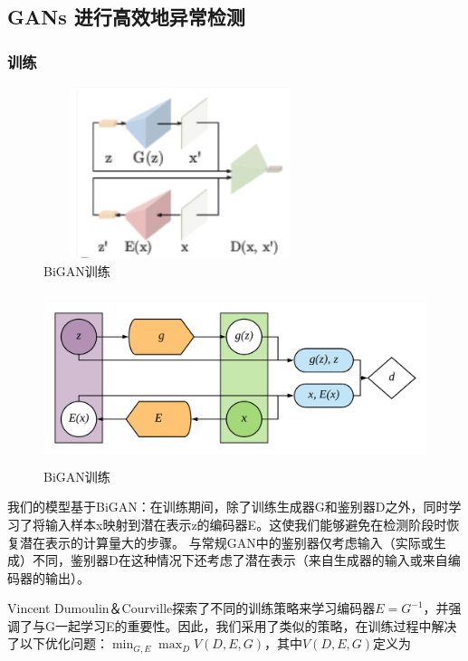\documentclass[12pt]{article}
\begin{document}
\subsection{\textbf{GANs 进行高效地异常检测}\label{header-n13}}

\subsubsection{训练}\label{header-n14}

\begin{figure}[htbp]
\centering
\includegraphics[height=5cm,width=8cm]{Report2-figure/image-20191001141522578.png}
\caption{BiGAN训练}
\end{figure}


\begin{figure}[htbp]
\centering
\includegraphics [height=5cm,width=12cm]{Report2-figure/bigan_train.png}
\caption{BiGAN训练}
\end{figure}

我们的模型基于BiGAN：在训练期间，除了训练生成器G和鉴别器D之外，同时学习了将输入样本x映射到潜在表示z的编码器E。这使我们能够避免在检测阶段时恢复潜在表示的计算量大的步骤。
与常规GAN中的鉴别器仅考虑输入（实际或生成）不同，鉴别器D在这种情况下还考虑了潜在表示（来自生成器的输入或来自编码器的输出）。

Vincent
Dumoulin＆Courville探索了不同的训练策略来学习编码器\(E=G^{-1}\)，并强调了与G一起学习E的重要性。因此，我们采用了类似的策略，在训练过程中解决了以下优化问题：\(\min _{G, E} \max _{D} V(D, E, G)\)，其中\(V(D, E, G)\)定义为
\end{document}
